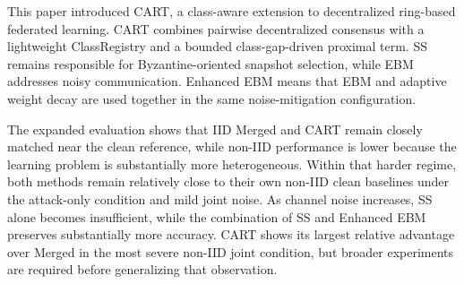 \documentclass[conference]{IEEEtran}
\begin{document}
This paper introduced CART, a class-aware extension to decentralized ring-based federated learning. CART combines pairwise decentralized consensus with a lightweight ClassRegistry and a bounded class-gap-driven proximal term. SS remains responsible for Byzantine-oriented snapshot selection, while EBM addresses noisy communication. Enhanced EBM means that EBM and adaptive weight decay are used together in the same noise-mitigation configuration.

The expanded evaluation shows that IID Merged and CART remain closely matched near the clean reference, while non-IID performance is lower because the learning problem is substantially more heterogeneous. Within that harder regime, both methods remain relatively close to their own non-IID clean baselines under the attack-only condition and mild joint noise. As channel noise increases, SS alone becomes insufficient, while the combination of SS and Enhanced EBM preserves substantially more accuracy. CART shows its largest relative advantage over Merged in the most severe non-IID joint condition, but broader experiments are required before generalizing that observation.



\end{document}
